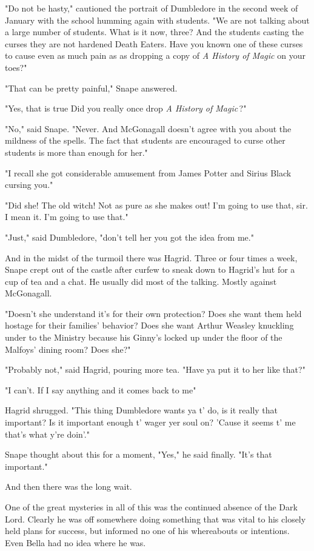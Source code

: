 "Do not be hasty," cautioned the portrait of Dumbledore in the second week of January with the school humming again with students. "We are not talking about a large number of students. What is it now, three? And the students casting the curses{\el} they are not hardened Death Eaters. Have you known one of these curses to cause even as much pain as{\el} as dropping a copy of \emph{A History of Magic} on your toes?"

"That can be pretty painful," Snape answered.

"Yes, that is true{\el} Did you really once drop \emph{A History of Magic}{\el}\,?"

"No," said Snape. "Never. And McGonagall doesn't agree with you about the mildness of the spells. The fact that students are encouraged to curse other students is more than enough for her."

"I recall she got considerable amusement from James Potter and Sirius Black cursing you."

"Did she! The old witch! Not as pure as she makes out! I'm going to use that, sir. I mean it. I'm going to use that."

"Just," said Dumbledore, "don't tell her you got the idea from me."

And in the midst of the turmoil there was Hagrid. Three or four times a week, Snape crept out of the castle after curfew to sneak down to Hagrid's hut for a cup of tea and a chat. He usually did most of the talking. Mostly against McGonagall.

"Doesn't she understand it's for their own protection? Does she want them held hostage for their families' behavior? Does she want Arthur Weasley knuckling under to the Ministry because his Ginny's locked up under the floor of the Malfoys' dining room? Does she?"

"Probably not," said Hagrid, pouring more tea. "Have ya put it to her like that?"

"I can't. If I say anything and it comes back to me{\el}"

Hagrid shrugged. "This thing Dumbledore wants ya t' do, is it really that important? Is it important enough t' wager yer soul on? 'Cause it seems t' me that's what y're doin'."

Snape thought about this for a moment, "Yes," he said finally. "It's that important."

And then there was the long wait.

One of the great mysteries in all of this was the continued absence of the Dark Lord. Clearly he was off somewhere doing something that was vital to his closely held plans for success, but informed no one of his whereabouts or intentions. Even Bella had no idea where he was.

